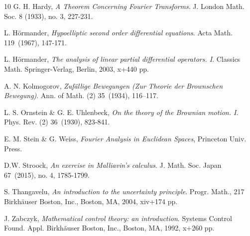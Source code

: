 \documentclass[11pt,a4paper]{amsart}
\numberwithin{equation}{section}
\numberwithin{equation}{section}
\begin{document}
\begin{thebibliography}{10}
G. H. Hardy, \emph{A Theorem Concerning Fourier Transforms}.
J. London Math. Soc. 8 (1933), no. 3, 227-231.

L. H{\"o}rmander,
\textit{Hypoelliptic second order differential equations}. Acta Math. 119~(1967), 147-171.

L. H{\"o}rmander,
\textit{The analysis of linear partial differential operators. I}.
Classics Math.
Springer-Verlag, Berlin, 2003, x+440 pp.




A. N. Kolmogorov,  
\textit{Zuf\"allige Bewegungen (Zur Theorie der Brownschen Bewegung)}. Ann. of Math. (2) 35~(1934), 116--117.









L. S. Ornstein \& G. E. Uhlenbeck, \emph{On the theory of the Brownian motion. I}.
Phys. Rev. (2) 36~(1930), 823-841. 


E. M. Stein \& G. Weiss, \emph{Fourier Analysis in Euclidean
Spaces}, Princeton Univ. Press.

D.W. Stroock, \emph{An exercise in Malliavin's calculus}. J. Math. Soc. Japan 67~(2015), no. 4, 1785-1799. 

S. Thangavelu, \emph{An introduction to the uncertainty principle}.
Progr. Math., 217
Birkh\"auser Boston, Inc., Boston, MA, 2004, xiv+174 pp.


J. Zabczyk, \emph{Mathematical control theory: an introduction}.
Systems Control Found. Appl.
Birkh\"auser Boston, Inc., Boston, MA, 1992, x+260 pp.

\end{thebibliography}
\end{document}

